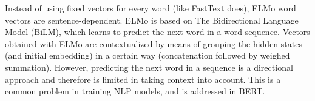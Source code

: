 \documentclass[a4paper,fleqn,longmktitle]{cas-dc}
\begin{document}
Instead of using fixed vectors for every word (like FastText does), ELMo word vectors are sentence-dependent. ELMo is based on The Bidirectional Language Model (BiLM), which learns to predict the next word in a word sequence. Vectors obtained with ELMo are contextualized by means of grouping the hidden states (and initial embedding) in a certain way (concatenation followed by weighed summation).
However, predicting the next word in a sequence is a directional approach and therefore is limited in taking context into account. This is a common problem in training NLP models, and is addressed in BERT.
\end{document}
